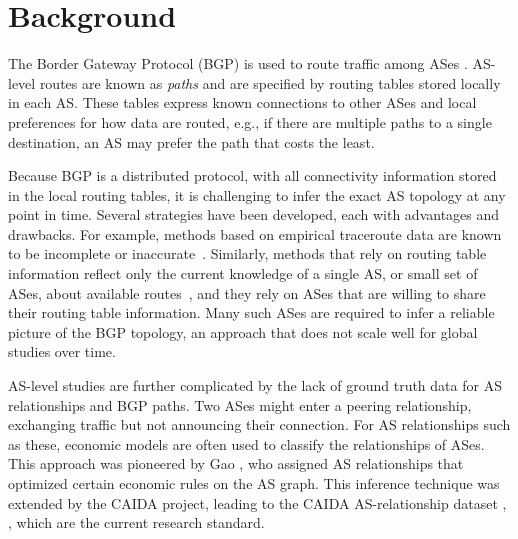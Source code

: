 \section{Background}

The Border Gateway
Protocol (BGP) is used to route traffic among ASes \cite{bgp}.  AS-level routes
are known as \emph{paths} and are specified by routing tables stored locally in
each AS. These tables express known connections to other ASes and local
preferences for how data are routed, e.g., if there are multiple paths to a
single destination, an AS may prefer the path that costs the least.

Because BGP is a distributed protocol, with all connectivity
information stored in the local routing tables, it is challenging to
infer the exact AS topology at any point in time.  Several strategies
have been developed, each with advantages and drawbacks. For example,
methods based on empirical traceroute data are known to be incomplete
or inaccurate~\cite{tracerouteProblems}. Similarly, methods that rely
on routing table information reflect only the current knowledge of a
single AS, or small set of ASes, about available
routes~\cite{BGPStream}, and they rely on ASes that are willing to
share their routing table information.  Many such ASes are required
to infer a reliable picture of the BGP topology, an approach that does not scale well for global studies over time. 

\par AS-level studies are further complicated by the lack of ground
truth data for AS relationships and BGP paths. Two ASes might enter a peering relationship,
exchanging traffic but not announcing their connection. For AS relationships such as these, economic models are often used to classify
the relationships of ASes. This approach was pioneered by Gao \cite{gao}, who
assigned AS relationships that optimized certain economic rules on the AS graph.
This inference technique was extended by the CAIDA project,
leading to the CAIDA AS-relationship dataset \cite{CAIDApaper},
\cite{CAIDA}, which are the current research standard.


